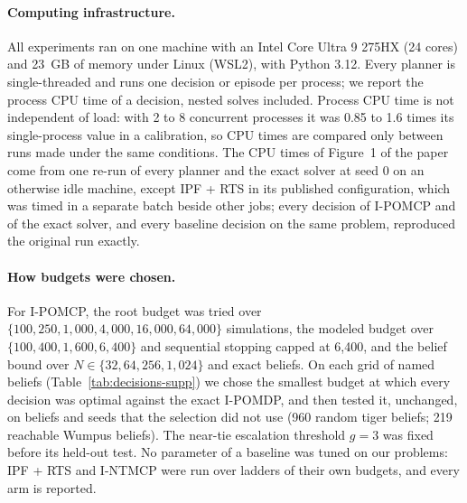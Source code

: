 \documentclass{article}
\begin{document}
\paragraph{Computing infrastructure.} All experiments ran on one machine with an Intel Core Ultra 9 275HX (24 cores) and 23~GB of memory under Linux (WSL2), with Python 3.12. Every planner is single-threaded and runs one decision or episode per process; we report the process CPU time of a decision, nested solves included. Process CPU time is not independent of load: with 2 to 8 concurrent processes it was 0.85 to 1.6 times its single-process value in a calibration, so CPU times are compared only between runs made under the same conditions. The CPU times of Figure~1 of the paper come from one re-run of every planner and the exact solver at seed 0 on an otherwise idle machine, except IPF + RTS in its published configuration, which was timed in a separate batch beside other jobs; every decision of I-POMCP and of the exact solver, and every baseline decision on the same problem, reproduced the original run exactly.

\paragraph{How budgets were chosen.} For I-POMCP, the root budget was tried over $\{100, 250, 1{,}000, 4{,}000, 16{,}000, 64{,}000\}$ simulations, the modeled budget over $\{100, 400, 1{,}600, 6{,}400\}$ and sequential stopping capped at 6{,}400, and the belief bound over $N \in \{32, 64, 256, 1{,}024\}$ and exact beliefs. On each grid of named beliefs (Table~\ref{tab:decisions-supp}) we chose the smallest budget at which every decision was optimal against the exact I-POMDP, and then tested it, unchanged, on beliefs and seeds that the selection did not use (960 random tiger beliefs; 219 reachable Wumpus beliefs). The near-tie escalation threshold $g = 3$ was fixed before its held-out test. No parameter of a baseline was tuned on our problems: IPF + RTS and I-NTMCP were run over ladders of their own budgets, and every arm is reported.
\end{document}
